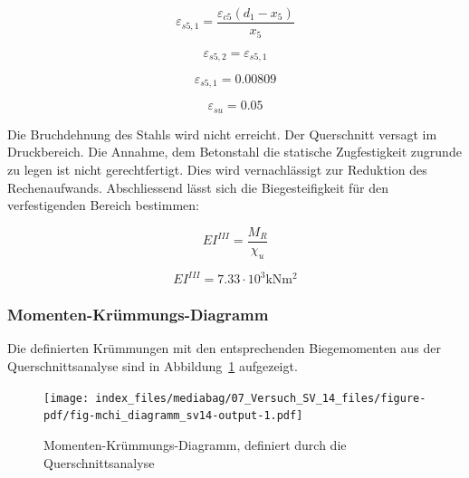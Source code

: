 \documentclass[
  12pt,
  letterpaper,
  egregdoesnotlikesansseriftitles]{scrreprt}
\begin{document}
\begin{equation}\varepsilon_{s5,1} = \frac{\varepsilon_{c5} \left(d_{1} - x_{5}\right)}{x_{5}}\end{equation}

\begin{equation}\varepsilon_{s5,2} = \varepsilon_{s5,1}\end{equation}

\begin{equation}\varepsilon_{s5,1} = 0.00809\end{equation}

\begin{equation}\varepsilon_{su} = 0.05\end{equation}

Die Bruchdehnung des Stahls wird nicht erreicht. Der Querschnitt versagt
im Druckbereich. Die Annahme, dem Betonstahl die statische Zugfestigkeit
zugrunde zu legen ist nicht gerechtfertigt. Dies wird vernachlässigt zur
Reduktion des Rechenaufwands. Abschliessend lässt sich die
Biegesteifigkeit für den verfestigenden Bereich bestimmen:

\begin{equation}EI^{III} = \frac{M_{R}}{\chi_{u}}\end{equation}

\begin{equation}EI^{III} = 7.33 \cdot 10^{3} \text{kN} \text{m}^{2}\end{equation}

\hypertarget{momenten-kruxfcmmungs-diagramm-1}{%
\subsubsection{Momenten-Krümmungs-Diagramm}\label{momenten-kruxfcmmungs-diagramm-1}}

Die definierten Krümmungen mit den entsprechenden Biegemomenten aus der
Querschnittsanalyse sind in Abbildung~\ref{fig-mchi_diagramm_sv14}
aufgezeigt.

\begin{figure}[H]

{\centering \texttt{[image: index\_files/mediabag/07\_Versuch\_SV\_14\_files/figure-pdf/fig-mchi\_diagramm\_sv14-output-1.pdf]}

}

\caption{\label{fig-mchi_diagramm_sv14}Momenten-Krümmungs-Diagramm,
definiert durch die Querschnittsanalyse}

\end{figure}
\end{document}
